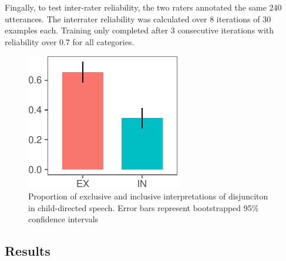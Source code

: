 \documentclass[10pt, letterpaper]{article}
\newenvironment{CodeChunk}{}{}
\begin{document}
Fingally, to test inter-rater reliability, the two raters annotated the
same 240 utterances. The interrater reliability was calculated over 8
iterations of 30 examples each. Training only completed after 3
consecutive iterations with reliability over 0.7 for all categories.

\begin{CodeChunk}
\begin{figure}[b]

{\centering \includegraphics{figs/interpretation-1} 

}

\caption[Proportion of exclusive and inclusive interpretations of disjunciton in child-directed speech]{Proportion of exclusive and inclusive interpretations of disjunciton in child-directed speech. Error bars represent bootstrapped 95\% confidence intervals}\label{fig:interpretation}
\end{figure}
\end{CodeChunk}

\subsection{Results}\label{results-1}
\end{document}
